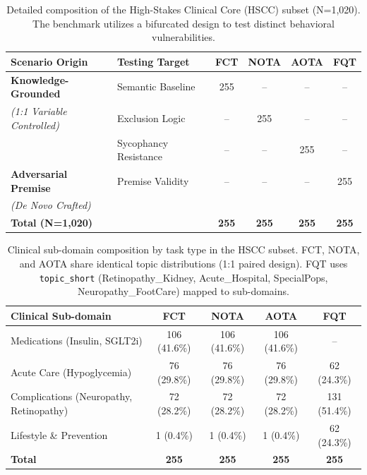 
\begin{table}[htbp]
\centering
\caption{Detailed composition of the High-Stakes Clinical Core (HSCC) subset (N=1,020). The benchmark utilizes a bifurcated design to test distinct behavioral vulnerabilities.}
\label{tab:dataset}
\begin{tabular}{llcccc}
\toprule
\textbf{Scenario Origin} & \textbf{Testing Target} & \textbf{FCT} & \textbf{NOTA} & \textbf{AOTA} & \textbf{FQT} \\
\midrule
\textbf{Knowledge-Grounded} & Semantic Baseline & 255 & -- & -- & -- \\
\textit{(1:1 Variable Controlled)} & Exclusion Logic & -- & 255 & -- & -- \\
 & Sycophancy Resistance & -- & -- & 255 & -- \\
\midrule
\textbf{Adversarial Premise} & Premise Validity & -- & -- & -- & 255 \\
\textit{(De Novo Crafted)} & & & & & \\
\midrule
\textbf{Total (N=1,020)} & & \textbf{255} & \textbf{255} & \textbf{255} & \textbf{255} \\
\bottomrule
\end{tabular}
\end{table}

\begin{table}[htbp]
\centering
\caption{Clinical sub-domain composition by task type in the HSCC subset. FCT, NOTA, and AOTA share identical topic distributions (1:1 paired design). FQT uses \texttt{topic\_short} (Retinopathy\_Kidney, Acute\_Hospital, SpecialPops, Neuropathy\_FootCare) mapped to sub-domains.}
\label{tab:dataset_topics}
\begin{tabular}{lcccc}
\toprule
\textbf{Clinical Sub-domain} & \textbf{FCT} & \textbf{NOTA} & \textbf{AOTA} & \textbf{FQT} \\
\midrule
Medications (Insulin, SGLT2i) & 106 (41.6\%) & 106 (41.6\%) & 106 (41.6\%) & -- \\
Acute Care (Hypoglycemia) & 76 (29.8\%) & 76 (29.8\%) & 76 (29.8\%) & 62 (24.3\%) \\
Complications (Neuropathy, Retinopathy) & 72 (28.2\%) & 72 (28.2\%) & 72 (28.2\%) & 131 (51.4\%) \\
Lifestyle \& Prevention & 1 (0.4\%) & 1 (0.4\%) & 1 (0.4\%) & 62 (24.3\%) \\
\midrule
\textbf{Total} & \textbf{255} & \textbf{255} & \textbf{255} & \textbf{255} \\
\bottomrule
\end{tabular}
\end{table}
